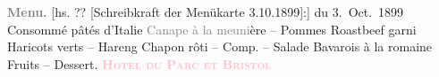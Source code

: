            \centering{}\textcolor{gray}{\textbf{Menu.}}{ }{[}hs. ?? [Schreibkraft der Menükarte 3.10.1899]:{]} du 3. Oct. 1899\pend
           \pstart
           \noindent{}\centering{}Consommé pâtés d’Italie\pend
           \pstart
           \noindent{}\centering{}\textcolor{gray}{Canape à la meuni}ère – Pommes\pend
           \pstart
           \noindent{}\centering{}Roastbeef garni\pend
           \pstart
           \noindent{}\centering{}Haricots verts – Hareng\pend
           \pstart
           \noindent{}\centering{}Chapon rôti – Comp. – Salade\pend
           \pstart
           \noindent{}\centering{}Bavarois à la romaine\pend
           \pstart
           \noindent{}\centering{}Fruits – Dessert.\pend
           \pstart
           \noindent{}\textcolor{gray}{\textbf{\textsc{\textcolor{pink}{Hotel du Parc et Bristol}{}\ledrightnote{\textcolor{pink}{Hôtel du Parc & Bristol}}}}}\pend
           \endnumbering{}  
      